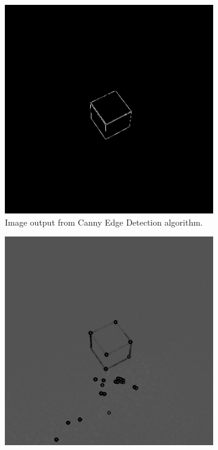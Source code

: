 \begin{figure}[H]
\begin{subfigure}[b]{0.49\textwidth}
         \includegraphics[width=\textwidth]{figures/202105/canny-edge-cube.png}
         \caption{Image output from Canny Edge Detection algorithm.}
         \label{fig:canny-edge-image}
    \end{subfigure}
    \begin{subfigure}[b]{0.49\textwidth}
         \includegraphics[width=\textwidth]{figures/202105/harris-corner-cube.png}

\end{subfigure}
\end{figure}
